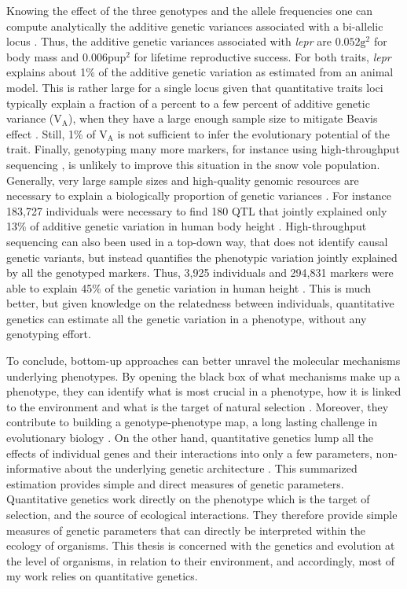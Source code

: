Knowing the effect of the three genotypes and the allele frequencies one can compute analytically the additive genetic variances associated with a bi-allelic locus \parencite[][p77]{Fisher1941average,Lynch1998}. Thus, the additive genetic variances associated with \emph{lepr} are $0.052 \text{g}^2$ for body mass and $0.006 \text{pup}^2$ for lifetime reproductive success. For both traits, \emph{lepr} explains about 1\% of the additive genetic variation as estimated from an animal model. This is rather large for a single locus given that quantitative traits loci typically explain a fraction of a percent to a few percent of additive genetic variance (V$_\text{A}$), when they have a large enough sample size to mitigate Beavis effect \parencite{Flint2009,Jensen2014}.  Still, 1\% of V$_\text{A}$ is not sufficient to infer the evolutionary potential of the trait. Finally, genotyping many more markers, for instance using high-throughput sequencing \parencite{Goodwin2016}, is unlikely to improve this situation in the snow vole population. Generally, very large sample sizes and high-quality genomic resources are necessary to explain a biologically proportion of genetic variances \parencite{Bloom2013, Jensen2014}. For instance
183,727 individuals were necessary to find 180 QTL that jointly explained only 13\% of additive genetic variation in human body height \parencite{LangoAllen2010}.
High-throughput sequencing can also been used in a top-down way, that does not identify causal genetic variants, but instead quantifies the phenotypic variation jointly explained by all the genotyped markers. Thus, 3,925 individuals and 294,831 markers were able to explain 45\% of the genetic variation in human height \parencite{Yang2010}. This is much better, but given knowledge on the relatedness between individuals, quantitative genetics can estimate all the genetic variation in a phenotype, without any genotyping effort.

To conclude, bottom-up approaches can better unravel the molecular mechanisms underlying phenotypes. By opening the black box of what mechanisms make up a phenotype, they can identify what is most crucial in a phenotype, how it is linked to the environment and what is the target of natural selection \parencite{DeJong2014}. Moreover, they contribute to building a genotype-phenotype map, a long lasting challenge in evolutionary biology \parencite{Kirschner2010}.
On the other hand, quantitative genetics lump all the effects of individual genes and their interactions into only a few parameters, non-informative about the underlying genetic architecture \parencite{Mackay2001,Nietlisbach2015,Huang041434}.  This summarized estimation provides simple and direct measures of genetic parameters. Quantitative genetics work directly on the phenotype which is the target of selection, and the source of ecological interactions. They therefore provide simple measures of genetic parameters that can directly be interpreted within the ecology of organisms.
This thesis is concerned with the genetics and evolution at the level of organisms, in relation to their environment, and accordingly, most of my work relies on quantitative genetics.

